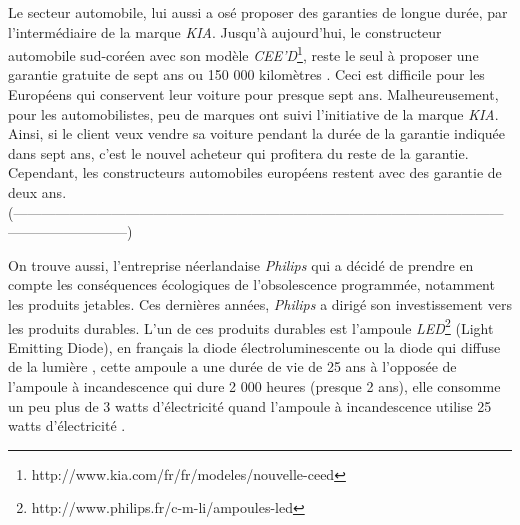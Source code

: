 \bigbreak
Le secteur automobile, lui aussi a osé proposer des garanties de longue durée, par l'intermédiaire de la marque \textit{KIA}. Jusqu'à aujourd'hui, le constructeur automobile sud-coréen avec son modèle \textit{CEE'D}\footnote{http://www.kia.com/fr/fr/modeles/nouvelle-ceed}, reste le seul à proposer une garantie gratuite de sept ans ou 150 000 kilomètres \cite{kia}. Ceci est difficile pour les Européens qui conservent leur voiture pour presque sept ans. Malheureusement, pour les automobilistes, peu de marques ont suivi l’initiative de la marque \textit{KIA}. Ainsi, si le client veux vendre sa voiture pendant la durée de la garantie indiquée dans sept ans, c'est le nouvel acheteur qui profitera du reste de la garantie. Cependant, les constructeurs automobiles européens restent avec des garantie de deux ans.
(-----------------------------------------------------------------------------------------------------------------------------------)

\bigbreak
On trouve aussi, l'entreprise néerlandaise \textit{Philips} qui a décidé de prendre en compte les conséquences écologiques de l'obsolescence programmée, notamment les produits jetables. Ces dernières années, \textit{Philips} a dirigé son investissement vers  les produits durables. L'un de ces produits durables est l'ampoule \textit{LED}\footnote{http://www.philips.fr/c-m-li/ampoules-led} (Light Emitting Diode), en français la diode électroluminescente ou la diode qui  diffuse de la lumière , cette ampoule a une durée de vie de 25 ans à l'opposée de l'ampoule à incandescence qui dure 2 000 heures (presque 2 ans), elle consomme un peu plus de 3 watts d’électricité quand l'ampoule à incandescence utilise 25 watts d’électricité \cite{ampoule_inc}. 


